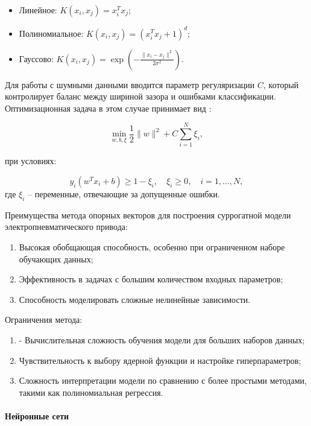 \begin{itemize}
    \item Линейное: $K(x_i, x_j) = x_i^T x_j$;
    \item Полиномиальное: $K(x_i, x_j) = (x_i^T x_j + 1)^d$;
    \item Гауссово: $K(x_i, x_j) = \exp\left(-\frac{\|x_i - x_j\|^2}{2\sigma^2}\right)$.
\end{itemize}

Для работы с шумными данными вводится параметр регуляризации $C$,
который контролирует баланс между шириной зазора и ошибками классификации.
Оптимизационная задача в этом случае принимает вид \cite{Boswell2002}:

\begin{equation*}
    \min_{w, b, \xi} \frac{1}{2} \|w\|^2 + C \sum_{i=1}^N \xi_i,
\end{equation*}

при условиях:

\begin{equation*}
    y_i (w^T x_i + b) \geq 1 - \xi_i, \quad \xi_i \geq 0, \quad i = 1, \ldots, N,
\end{equation*}
где $\xi_i$ -- переменные, отвечающие за допущенные ошибки.

Преимущества метода опорных векторов для построения суррогатной модели электропневматического привода:

\begin{enumerate}
    \item Высокая обобщающая способность, особенно при ограниченном наборе обучающих данных;
    \item Эффективность в задачах с большим количеством входных параметров;
    \item Способность моделировать сложные нелинейные зависимости.
\end{enumerate}

Ограничения метода:

\begin{enumerate}
    \item - Вычислительная сложность обучения модели для больших наборов данных;
    \item Чувствительность к выбору ядерной функции и настройке гиперпараметров;
    \item Сложность интерпретации модели по сравнению с более простыми методами, такими как полиномиальная регрессия.
\end{enumerate}

\paragraph{Нейронные сети}\label{sec:ch4/sec2/subsec1/subsubsec5}


